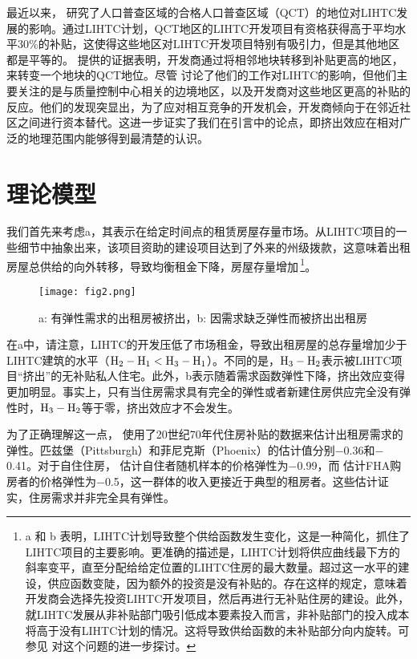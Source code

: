 \documentclass[lang=cn,11pt,a4paper]{paper}
\begin{document}
最近以来，\cite{Baum-Snow2009654} 研究了人口普查区域的合格人口普查区域（QCT）的地位对LIHTC发展的影响。通过LIHTC计划，QCT地区的LIHTC开发项目有资格获得高于平均水平30\%的补贴，这使得这些地区对LIHTC开发项目特别有吸引力，但是其他地区都是平等的。\cite{Baum-Snow2009654} 提供的证据表明，开发商通过将相邻地块转移到补贴更高的地区，来转变一个地块的QCT地位。尽管 \cite{Baum-Snow2009654} 讨论了他们的工作对LIHTC的影响，但他们主要关注的是与质量控制中心相关的边境地区，以及开发商对这些地区更高的补贴的反应。他们的发现突显出，为了应对相互竞争的开发机会，开发商倾向于在邻近社区之间进行资本替代。这进一步证实了我们在引言中的论点，即挤出效应在相对广泛的地理范围内能够得到最清楚的认识。

\section{理论模型}\label{sec3}

我们首先来考虑a，其表示在给定时间点的租赁房屋存量市场。从LIHTC项目的一些细节中抽象出来，该项目资助的建设项目达到了外来的州级拨款，这意味着出租房屋总供给的向外转移，导致均衡租金下降，房屋存量增加\,\footnote{a 和 b 表明，LIHTC计划导致整个供给函数发生变化，这是一种简化，抓住了LIHTC项目的主要影响。更准确的描述是，LIHTC计划将供应曲线最下方的斜率变平，直至分配给给定位置的LIHTC住房的最大数量。超过这一水平的建设，供应函数变陡，因为额外的投资是没有补贴的。存在这样的规定，意味着开发商会选择先投资LIHTC开发项目，然后再进行无补贴住房的建设。此外，就LIHTC发展从非补贴部门吸引低成本要素投入而言，非补贴部门的投入成本将高于没有LIHTC计划的情况。这将导致供给函数的未补贴部分向内旋转。可参见 \cite{Olsen2007618} 对这个问题的进一步探讨。}。

\begin{figure}[h]
	\centering
	\texttt{[image: fig2.png]}
	\caption{a: 有弹性需求的出租房被挤出，b: 因需求缺乏弹性而被挤出出租房}\label{fig2}
\end{figure}

在a中，请注意，LIHTC的开发压低了市场租金，导致出租房屋的总存量增加少于LIHTC建筑的水平（$\rm{H}_2-\rm{H}_1 < \rm{H}_3-\rm{H}_1$）。不同的是，$\rm{H}_3-\rm{H}_2$表示被LIHTC项目“挤出”的无补贴私人住宅。此外，b表示随着需求函数弹性下降，挤出效应变得更加明显。事实上，只有当住房需求具有完全的弹性或者新建住房供应完全没有弹性时，$\rm{H}_3-\rm{H}_2$等于零，挤出效应才不会发生。

为了正确理解这一点，\cite{Hanushek1980449} 使用了20世纪70年代住房补贴的数据来估计出租房需求的弹性。匹兹堡（Pittsburgh）和菲尼克斯（Phoenix）的估计值分别$-$0.36和$-$0.41。对于自住住房，\cite{Rosen19791} 估计自住者随机样本的价格弹性为$-$0.99，而 \cite{Rosen19791} 估计FHA购房者的价格弹性为$-$0.5，这一群体的收入更接近于典型的租房者。这些估计证实，住房需求并非完全具有弹性。
\end{document}
